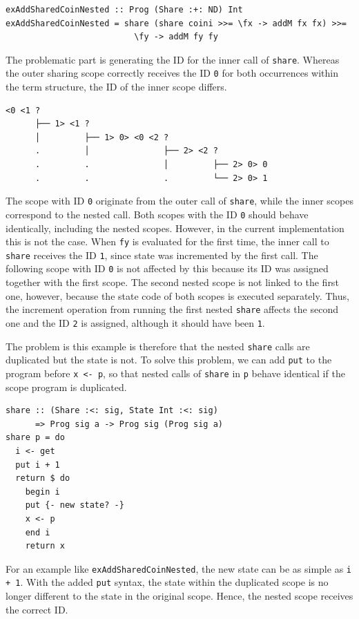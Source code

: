 \documentclass[a4paper, 11pt, fleqn, twoside]{scrreprt}
\newcommand{\hinl}[1]{\texttt{#1}}
\begin{document}
\begin{verbatim}
exAddSharedCoinNested :: Prog (Share :+: ND) Int
exAddSharedCoinNested = share (share coini >>= \fx -> addM fx fx) >>= 
                          \fy -> addM fy fy
\end{verbatim}

The problematic part is generating the ID for the inner call of \hinl{share}.
Whereas the outer sharing scope correctly receives the ID \hinl{0} for both occurrences within the term structure, the ID of the inner scope differs.

\begin{verbatim}
<0 <1 ? 
      ├── 1> <1 ? 
      │         ├── 1> 0> <0 <2 ? 
      .         │               ├── 2> <2 ? 
      .         .               │         ├── 2> 0> 0
      .         .               .         └── 2> 0> 1
\end{verbatim}

The scope with ID \hinl{0} originate from the outer call of \hinl{share}, while the inner scopes correspond to the nested call.
Both scopes with the ID \hinl{0} should behave identically, including the nested scopes.
However, in the current implementation this is not the case.
When \hinl{fy} is evaluated for the first time, the inner call to \hinl{share} receives the ID \hinl{1}, since state was incremented by the first call.
The following scope with ID \hinl{0} is not affected by this because its ID was assigned together with the first scope.
The second nested scope is not linked to the first one, however, because the state code of both scopes is executed separately.
Thus, the increment operation from running the first nested \hinl{share} affects the second one and the ID \hinl{2} is assigned, although it should have been \hinl{1}.

The problem is this example is therefore that the nested \hinl{share} calls are duplicated but the state is not.
To solve this problem, we can add \hinl{put} to the program before \hinl{x <- p}, so that  nested calls of \hinl{share} in \hinl{p} behave identical if the scope program is duplicated.

\begin{verbatim}
share :: (Share :<: sig, State Int :<: sig) 
      => Prog sig a -> Prog sig (Prog sig a)
share p = do
  i <- get
  put i + 1
  return $ do
    begin i
    put {- new state? -}
    x <- p
    end i
    return x
\end{verbatim}

For an example like \hinl{exAddSharedCoinNested}, the new state can be as simple as \hinl{i + 1}.
With the added \hinl{put} syntax, the state within the duplicated scope is no longer different to the state in the original scope.
Hence, the nested scope receives the correct ID.
\end{document}
